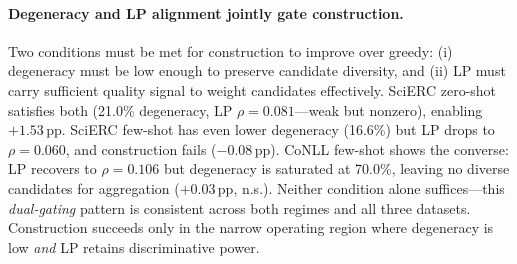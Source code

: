 \paragraph{Degeneracy and LP alignment jointly gate construction.}
Two conditions must be met for construction to improve over greedy: (i) degeneracy must be low enough to preserve candidate diversity, and (ii) LP must carry sufficient quality signal to weight candidates effectively.
SciERC zero-shot satisfies both (21.0\% degeneracy, LP $\rho{=}0.081$---weak but nonzero), enabling $+1.53$\,pp.
SciERC few-shot has even lower degeneracy (16.6\%) but LP drops to $\rho{=}0.060$, and construction fails ($-0.08$\,pp).
CoNLL few-shot shows the converse: LP recovers to $\rho{=}0.106$ but degeneracy is saturated at 70.0\%, leaving no diverse candidates for aggregation ($+0.03$\,pp, n.s.).
Neither condition alone suffices---this \emph{dual-gating} pattern is consistent across both regimes and all three datasets.
Construction succeeds only in the narrow operating region where degeneracy is low \emph{and} LP retains discriminative power.

